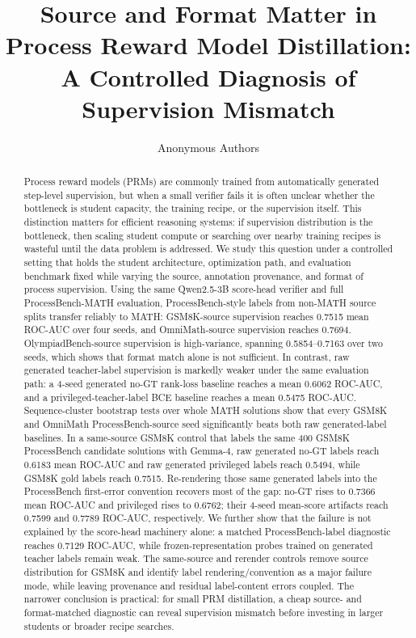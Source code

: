 \documentclass{article}
\title{Source and Format Matter in Process Reward Model Distillation:\\
A Controlled Diagnosis of Supervision Mismatch}
\author{Anonymous Authors}
\date{}
\begin{document}
\ifcolmsubmission
\linenumbers
\fi

\maketitle

\begin{abstract}
Process reward models (PRMs) are commonly trained from automatically generated step-level supervision, but when a small verifier fails it is often unclear whether the bottleneck is student capacity, the training recipe, or the supervision itself.
This distinction matters for efficient reasoning systems: if supervision distribution is the bottleneck, then scaling student compute or searching over nearby training recipes is wasteful until the data problem is addressed.
We study this question under a controlled setting that holds the student architecture, optimization path, and evaluation benchmark fixed while varying the source, annotation provenance, and format of process supervision.
Using the same Qwen2.5-3B score-head verifier and full ProcessBench-MATH evaluation, ProcessBench-style labels from non-MATH source splits transfer reliably to MATH: GSM8K-source supervision reaches 0.7515 mean ROC-AUC over four seeds, and OmniMath-source supervision reaches 0.7694.
OlympiadBench-source supervision is high-variance, spanning 0.5854--0.7163 over two seeds, which shows that format match alone is not sufficient.
In contrast, raw generated teacher-label supervision is markedly weaker under the same evaluation path: a 4-seed generated no-GT rank-loss baseline reaches a mean 0.6062 ROC-AUC, and a privileged-teacher-label BCE baseline reaches a mean 0.5475 ROC-AUC.
Sequence-cluster bootstrap tests over whole MATH solutions show that every GSM8K and OmniMath ProcessBench-source seed significantly beats both raw generated-label baselines.
In a same-source GSM8K control that labels the same 400 GSM8K ProcessBench candidate solutions with Gemma-4, raw generated no-GT labels reach 0.6183 mean ROC-AUC and raw generated privileged labels reach 0.5494, while GSM8K gold labels reach 0.7515.
Re-rendering those same generated labels into the ProcessBench first-error convention recovers most of the gap: no-GT rises to 0.7366 mean ROC-AUC and privileged rises to 0.6762; their 4-seed mean-score artifacts reach 0.7599 and 0.7789 ROC-AUC, respectively.
We further show that the failure is not explained by the score-head machinery alone: a matched ProcessBench-label diagnostic reaches 0.7129 ROC-AUC, while frozen-representation probes trained on generated teacher labels remain weak.
The same-source and rerender controls remove source distribution for GSM8K and identify label rendering/convention as a major failure mode, while leaving provenance and residual label-content errors coupled.
The narrower conclusion is practical: for small PRM distillation, a cheap source- and format-matched diagnostic can reveal supervision mismatch before investing in larger students or broader recipe searches.
\end{abstract}
\end{document}
